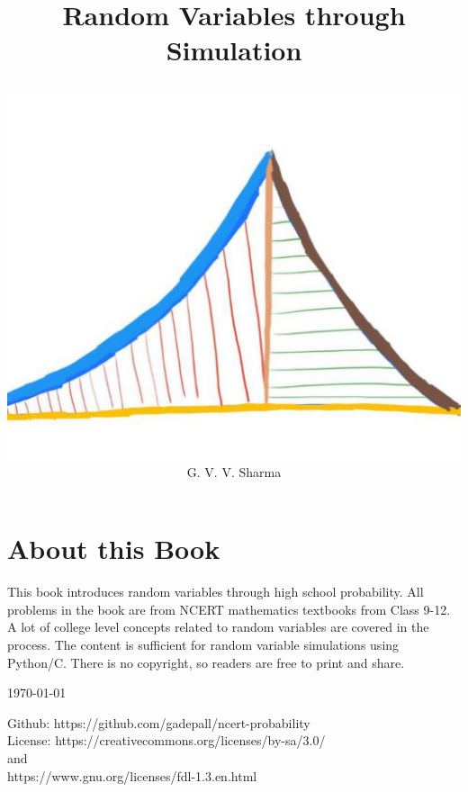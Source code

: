 \documentclass[journal]{IEEEtran}
\begin{document}

\onecolumn


\title{
	\begin{center}
	Random Variables through Simulation 
\end{center}
}
\author{
\vspace{11cm}
	\begin{center}
\includegraphics[width=0.2\columnwidth]{figs/logo.jpg}
\\
		{	\huge G. V. V. Sharma}
	\end{center}
}
\maketitle
\newpage

\section*{About this Book}

This book introduces random variables through high school probability. All problems in the book are from NCERT mathematics textbooks from Class 9-12.   
  A lot of college level concepts related to random variables are covered in the process.
The content is sufficient for random variable simulations using Python/C.
There is no copyright, so readers are free to print and share.  
\begin{flushright}
\today
\end{flushright}
Github: https://github.com/gadepall/ncert-probability
		\\
License: https://creativecommons.org/licenses/by-sa/3.0/
\\
and
\\
https://www.gnu.org/licenses/fdl-1.3.en.html
\end{document}
